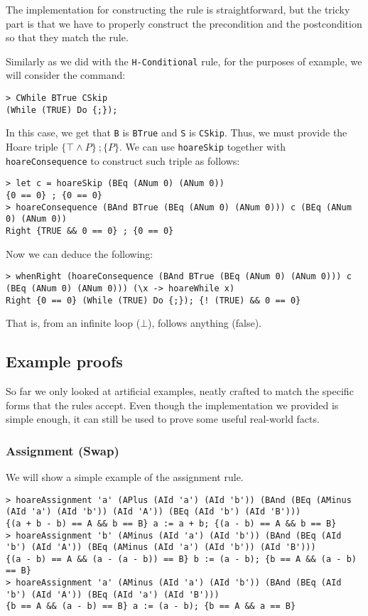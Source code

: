 \documentclass{article}
\begin{document}
The implementation for constructing the rule is straightforward, but the tricky part is that we have to properly construct the precondition and the postcondition so that they match the rule.

Similarly as we did with the \texttt{H-Conditional} rule, for the purposes of example, we will consider the command:

\begin{lstlisting}
> CWhile BTrue CSkip
(While (TRUE) Do {;});
\end{lstlisting}

In this case, we get that \texttt{B} is \texttt{BTrue} and \texttt{S} is \texttt{CSkip}. Thus, we must provide the Hoare triple $\{\top \land P \} \ ; \{P\}$. We can use \texttt{hoareSkip} together with \texttt{hoareConsequence} to construct such triple as follows:

\begin{lstlisting}
> let c = hoareSkip (BEq (ANum 0) (ANum 0))
{0 == 0} ; {0 == 0}
> hoareConsequence (BAnd BTrue (BEq (ANum 0) (ANum 0))) c (BEq (ANum 0) (ANum 0))
Right {TRUE && 0 == 0} ; {0 == 0}
\end{lstlisting}

Now we can deduce the following:

\begin{lstlisting}
> whenRight (hoareConsequence (BAnd BTrue (BEq (ANum 0) (ANum 0))) c (BEq (ANum 0) (ANum 0))) (\x -> hoareWhile x)
Right {0 == 0} (While (TRUE) Do {;}); {! (TRUE) && 0 == 0}
\end{lstlisting}

That is, from an infinite loop ($\bot$), follows anything (false).

\subsection{Example proofs}

So far we only looked at artificial examples, neatly crafted to match the specific forms that the rules accept. Even though the implementation we provided is simple enough, it can still be used to prove some useful real-world facts.

\subsubsection{Assignment (Swap)}

We will show a simple example of the assignment rule.

\begin{lstlisting}
> hoareAssignment 'a' (APlus (AId 'a') (AId 'b')) (BAnd (BEq (AMinus (AId 'a') (AId 'b')) (AId 'A')) (BEq (AId 'b') (AId 'B')))
{(a + b - b) == A && b == B} a := a + b; {(a - b) == A && b == B}
> hoareAssignment 'b' (AMinus (AId 'a') (AId 'b')) (BAnd (BEq (AId 'b') (AId 'A')) (BEq (AMinus (AId 'a') (AId 'b')) (AId 'B')))
{(a - b) == A && (a - (a - b)) == B} b := (a - b); {b == A && (a - b) == B}
> hoareAssignment 'a' (AMinus (AId 'a') (AId 'b')) (BAnd (BEq (AId 'b') (AId 'A')) (BEq (AId 'a') (AId 'B')))
{b == A && (a - b) == B} a := (a - b); {b == A && a == B}
\end{lstlisting}
\end{document}
